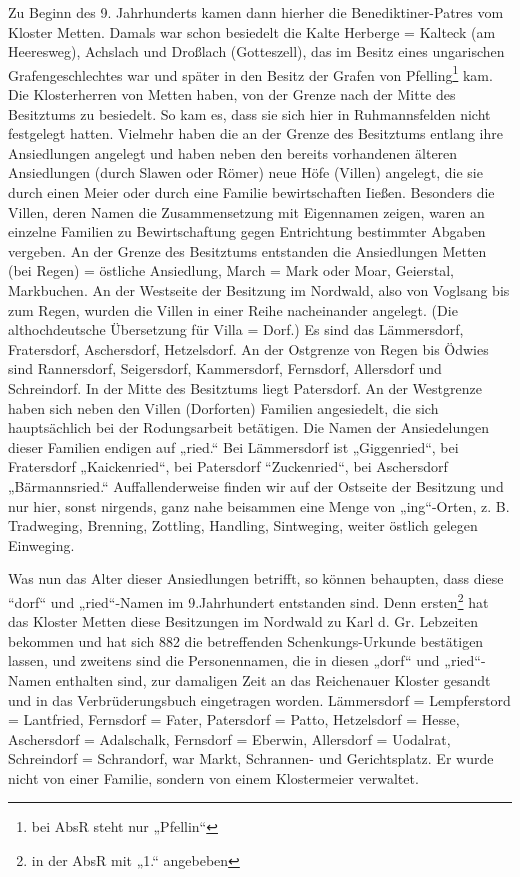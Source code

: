 \documentclass[12pt,a4paper]{book}
\begin{document}
Zu Beginn des 9. Jahrhunderts kamen dann hierher die Benediktiner-Patres vom
Kloster Metten. Damals war schon besiedelt die Kalte Herberge = Kalteck (am
Heeresweg), Achslach und Droßlach (Gotteszell), das im Besitz eines ungarischen
Grafengeschlechtes war und später in den Besitz der Grafen von
Pfelling\footnote{bei AbsR steht nur „Pfellin“} kam. Die Klosterherren von
Metten haben, von der Grenze nach der Mitte des Besitztums zu besiedelt. So kam
es, dass sie sich hier in Ruhmannsfelden nicht festgelegt hatten. Vielmehr haben
die an der Grenze des Besitztums entlang ihre Ansiedlungen angelegt und haben
neben den bereits vorhandenen älteren Ansiedlungen (durch Slawen oder Römer)
neue Höfe (Villen) angelegt, die sie durch einen Meier oder durch eine Familie
bewirtschaften Iießen. Besonders die Villen, deren Namen die Zusammensetzung mit
Eigennamen zeigen, waren an einzelne Familien zu Bewirtschaftung gegen
Entrichtung bestimmter Abgaben vergeben. An der Grenze des Besitztums entstanden
die Ansiedlungen Metten (bei Regen) = östliche Ansiedlung, March = Mark oder
Moar, Geierstal, Markbuchen. An der Westseite der Besitzung im Nordwald, also
von Voglsang bis zum Regen, wurden die Villen in einer Reihe nacheinander
angelegt. (Die althochdeutsche Übersetzung für Villa = Dorf.) Es sind das
Lämmersdorf, Fratersdorf, Aschersdorf, Hetzelsdorf. An der Ostgrenze von Regen
bis Ödwies sind Rannersdorf, Seigersdorf, Kammersdorf, Fernsdorf, Allersdorf und
Schreindorf. In der Mitte des Besitztums liegt Patersdorf. An der Westgrenze
haben sich neben den Villen (Dorforten) Familien angesiedelt, die sich
hauptsächlich bei der Rodungsarbeit betätigen. Die Namen der Ansiedelungen
dieser Familien endigen auf „ried.“ Bei Lämmersdorf ist „Giggenried“, bei
Fratersdorf „Kaickenried“, bei Patersdorf “Zuckenried“, bei Aschersdorf
„Bärmannsried.“ Auffallenderweise finden wir auf der Ostseite der Besitzung und
nur hier, sonst nirgends, ganz nahe beisammen eine Menge von „ing“-Orten, z. B.
Tradweging, Brenning, Zottling, Handling, Sintweging, weiter östlich gelegen
Einweging.

Was nun das Alter dieser Ansiedlungen betrifft, so können behaupten, dass diese
“dorf“ und „ried“-Namen im 9.Jahrhundert entstanden sind. Denn
ersten\footnote{in der AbsR mit „1.“ angebeben} hat das Kloster Metten diese
Besitzungen im Nordwald zu Karl d. Gr. Lebzeiten bekommen und hat sich 882 die
betreffenden Schenkungs-Urkunde bestätigen lassen, und zweitens sind die
Personennamen, die in diesen „dorf“ und „ried“-Namen enthalten sind, zur
damaligen Zeit an das Reichenauer Kloster gesandt und in das Verbrüderungsbuch
eingetragen worden. Lämmersdorf = Lempferstord = Lantfried, Fernsdorf = Fater,
Patersdorf = Patto, Hetzelsdorf = Hesse, Aschersdorf = Adalschalk, Fernsdorf =
Eberwin, Allersdorf = Uodalrat, Schreindorf = Schrandorf, war Markt, Schrannen-
und Gerichtsplatz. Er wurde nicht von einer Familie, sondern von einem
Klostermeier verwaltet.
\end{document}
